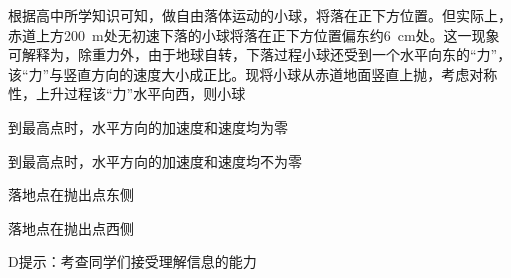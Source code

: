 根据高中所学知识可知，做自由落体运动的小球，将落在正下方位置。但实际上，赤道上方\qty{200}{m}处无初速下落的小球将落在正下方位置偏东约\qty{6}{cm}处。这一现象可解释为，除重力外，由于地球自转，下落过程小球还受到一个水平向东的“力”，该“力”与竖直方向的速度大小成正比。现将小球从赤道地面竖直上抛，考虑对称性，上升过程该“力”水平向西，则小球\paren[]
\begin{choices}
	\item 到最高点时，水平方向的加速度和速度均为零
	\item 到最高点时，水平方向的加速度和速度均不为零
	\item 落地点在抛出点东侧
	\item 落地点在抛出点西侧
\end{choices}
\begin{answer}
	D\qquad 提示：考查同学们接受理解信息的能力
\end{answer}